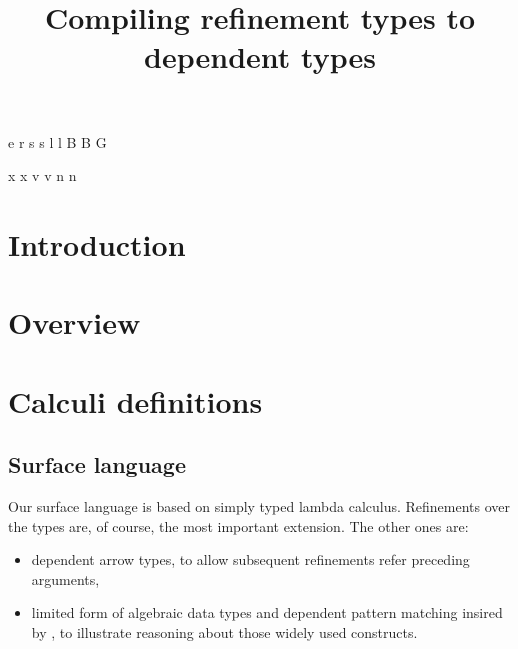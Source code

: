 \documentclass[a4paper]{article}
\begin{document}
\newnonterm e \varepsilon
{}
\newnonterm r \rho
{}
\newnonterm s s
\newnonterm l l
\newnonterm B B
\newnonterm G \Gamma
{}

\newgterm x x
\newgterm v v
\newgterm n n

\newcommand{\figref}[1]{Figure \ref{fig:#1}}


\title{Compiling refinement types to dependent types}

\maketitle

\section{Introduction}

\section{Overview}


\section{Calculi definitions}

\subsection{Surface language}

Our surface language is based on simply typed lambda calculus.
Refinements over the types are, of course, the most important extension.
The other ones are:
\begin{itemize}
  \item dependent arrow types, to allow subsequent refinements refer preceding arguments,
  \item limited form of algebraic data types and dependent pattern matching
    insired by \cite{TAPLVariants,Eisenberg16},
    to illustrate reasoning about those widely used constructs.
\end{itemize}
\end{document}

